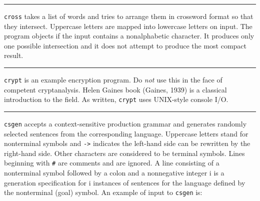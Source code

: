 {\vspace{0.25cm}\hrule{}

\texttt{cross} takes a list of words and tries to arrange them in
crossword format so that they intersect. Uppercase letters are mapped
into lowercase letters on input. The program objects if the input
contains a nonalphabetic character. It produces only one possible
intersection and it does not attempt to produce the most compact
result. 

\vspace{0.25cm}\hrule{}

\texttt{crypt} is an example encryption program. Do
\textit{not} use this in the face of competent cryptanalysis. Helen
Gaines{\textquotesingle} book (Gaines, 1939) is a classical
introduction to the field. As written, \texttt{crypt} uses UNIX-style
console I/O.

\vspace{0.25cm}\hrule{}

\texttt{csgen} accepts a context-sensitive production grammar and
generates randomly selected sentences from the corresponding language.
Uppercase letters stand for nonterminal symbols and
\texttt{{}-{\textgreater}} indicates the left-hand side can be
rewritten by the right-hand side. Other characters are considered to be
terminal symbols. Lines beginning with \texttt{\#} are comments and are
ignored. A line consisting of a nonterminal symbol followed by a colon
and a nonnegative integer i is a generation specification for i
instances of sentences for the language defined by the nonterminal
(goal) symbol. An example of input to \texttt{csgen} is:


}
